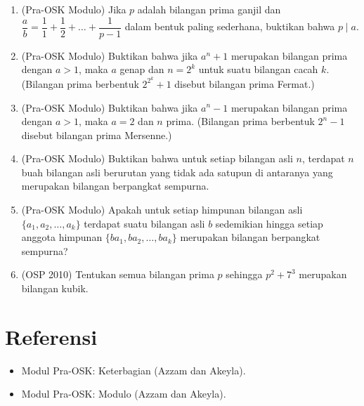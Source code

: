 \documentclass[12pt]{scrartcl}
\begin{document}
\begin{enumerate}[resume]
	\item (Pra-OSK Modulo)
	Jika $p$ adalah bilangan prima ganjil dan
	$\dfrac{a}{b} = \dfrac{1}{1} + \dfrac{1}{2} + \dots + \dfrac{1}{p - 1}$
	dalam bentuk paling sederhana,
	buktikan bahwa $p \mid a$.

	\item (Pra-OSK Modulo)
	Buktikan bahwa jika $a^n + 1$ merupakan bilangan prima dengan $a > 1$,
	maka $a$ genap dan $n = 2^k$ untuk suatu bilangan cacah $k$.
	(Bilangan prima berbentuk $2^{2^k} + 1$ disebut bilangan prima Fermat.)

	\item (Pra-OSK Modulo)
	Buktikan bahwa jika $a^n - 1$ merupakan bilangan prima dengan $a > 1$,
	maka $a = 2$ dan $n$ prima.
	(Bilangan prima berbentuk $2^n - 1$ disebut bilangan prima Mersenne.)

	\item (Pra-OSK Modulo)
	Buktikan bahwa untuk setiap bilangan asli $n$,
	terdapat $n$ buah bilangan asli berurutan yang tidak ada satupun
	di antaranya yang merupakan bilangan berpangkat sempurna.

	\item (Pra-OSK Modulo)
	Apakah untuk setiap himpunan bilangan asli $\{a_1, a_2, \ldots, a_k\}$
	terdapat suatu bilangan asli $b$ sedemikian hingga setiap anggota himpunan
	$\{ba_1, ba_2, \ldots, ba_k\}$ merupakan bilangan berpangkat sempurna?

	\item (OSP 2010)
	Tentukan semua bilangan prima $p$ sehingga $p^2 + 7^3$ merupakan bilangan kubik.

\end{enumerate}

\section{Referensi}
\begin{itemize}
    \item Modul Pra-OSK: Keterbagian (Azzam dan Akeyla).
    \item Modul Pra-OSK: Modulo (Azzam dan Akeyla).
\end{itemize}
\end{document}
